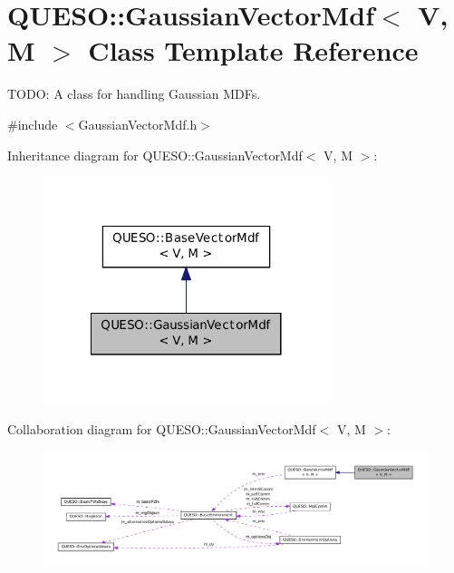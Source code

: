 \hypertarget{class_q_u_e_s_o_1_1_gaussian_vector_mdf}{\section{Q\-U\-E\-S\-O\-:\-:Gaussian\-Vector\-Mdf$<$ V, M $>$ Class Template Reference}
\label{class_q_u_e_s_o_1_1_gaussian_vector_mdf}
}


T\-O\-D\-O\-: A class for handling Gaussian M\-D\-Fs.  




{\ttfamily \#include $<$Gaussian\-Vector\-Mdf.\-h$>$}



Inheritance diagram for Q\-U\-E\-S\-O\-:\-:Gaussian\-Vector\-Mdf$<$ V, M $>$\-:
\nopagebreak
\begin{figure}[H]
\begin{center}
\leavevmode
\includegraphics[width=236pt]{class_q_u_e_s_o_1_1_gaussian_vector_mdf__inherit__graph}
\end{center}
\end{figure}


Collaboration diagram for Q\-U\-E\-S\-O\-:\-:Gaussian\-Vector\-Mdf$<$ V, M $>$\-:
\nopagebreak
\begin{figure}[H]
\begin{center}
\leavevmode
\includegraphics[width=350pt]{class_q_u_e_s_o_1_1_gaussian_vector_mdf__coll__graph}
\end{center}
\end{figure}
